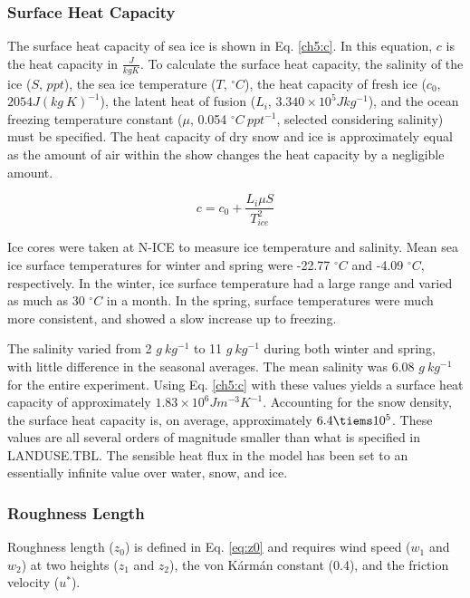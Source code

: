 \subsubsection{Surface Heat Capacity}
The surface heat capacity of sea ice is shown in Eq. \ref{ch5:c}. In this equation, $c$ is the heat capacity in $\frac{J}{kg K}$. To calculate the surface heat capacity, the salinity of the ice ($S$, $ppt$), the sea ice temperature ($T$, $^{\circ} C$), the heat capacity of fresh ice ($c_{0}$, $2054 J(kg~K)^{-1}$), the latent heat of fusion ($L_{i}$, $3.340 \times 10^{5} Jkg^{-1}$), and the ocean freezing temperature constant ($\mu$, 0.054 $^{\circ}C~ppt^{-1}$, selected considering salinity) must be specified. The heat capacity of dry snow and ice is approximately equal as the amount of air within the show changes the heat capacity by a negligible amount. 

\begin{equation}\label{ch5:c}
c = c_{0} + \frac{L_{i}\mu S}{T_{ice}^{2}}
\end{equation}

Ice cores were taken at N-ICE to measure ice temperature and salinity. Mean sea ice surface temperatures for winter and spring were -22.77 $^{\circ}C$ and -4.09 $^{\circ}C$, respectively. In the winter, ice surface temperature had a large range and varied as much as 30 $^{\circ}C$ in a month. In the spring, surface temperatures were much more consistent, and showed a slow increase up to freezing.

The salinity varied from 2 $g~kg^{-1}$ to 11 $g~kg^{-1}$ during both winter and spring, with little difference in the seasonal averages. The mean salinity was 6.08 $g~kg^{-1}$ for the entire experiment. Using Eq. \ref{ch5:c} with these values yields a surface heat capacity of approximately $1.83 \times 10^{6} Jm^{-3}K^{-1}$. Accounting for the snow density, the surface heat capacity is, on average, approximately $6.4 \tiems 10^{5}$. These values are all several orders of magnitude smaller than what is specified in LANDUSE.TBL. The sensible heat flux in the model has been set to an essentially infinite value over water, snow, and ice.

\subsubsection{Roughness Length}
Roughness length ($z_{0}$) is defined in Eq. \ref{eq:z0} and requires wind speed ($w_{1}$ and $w_{2}$) at two heights ($z_{1}$ and $z_{2}$), the von K\'{a}rm\'{a}n constant (0.4), and the friction velocity ($u^{*}$). 

